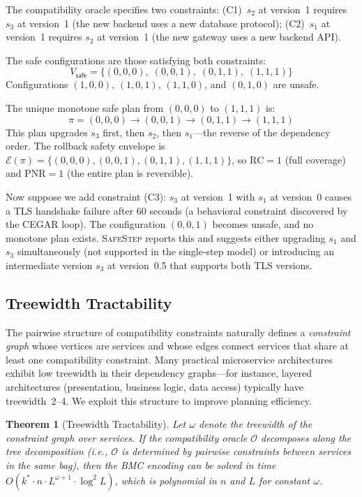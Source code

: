 \documentclass[10pt,twocolumn]{article}
\newtheorem{theorem}{Theorem}
\newcommand{\safestep}{\textsc{SafeStep}}
\newcommand{\ie}{\textit{i.e.}}
\begin{document}
The compatibility oracle specifies two constraints:
(C1)~$s_2$ at version~1 requires $s_3$ at version~1
(the new backend uses a new database protocol);
(C2)~$s_1$ at version~1 requires $s_2$ at version~1
(the new gateway uses a new backend API).

The safe configurations are those satisfying both constraints:
\[
V_{\mathsf{safe}} = \{(0,0,0),\; (0,0,1),\; (0,1,1),\; (1,1,1)\}
\]
Configurations $(1,0,0)$, $(1,0,1)$, $(1,1,0)$, and $(0,1,0)$
are unsafe.

The unique monotone safe plan from $(0,0,0)$ to $(1,1,1)$ is:
\[
\pi = (0,0,0) \to (0,0,1) \to (0,1,1) \to (1,1,1)
\]
This plan upgrades $s_3$ first, then $s_2$, then $s_1$---the
reverse of the dependency order. The rollback safety envelope
is $\mathcal{E}(\pi) = \{(0,0,0), (0,0,1), (0,1,1), (1,1,1)\}$,
so $\mathrm{RC} = 1$ (full coverage) and
$\mathrm{PNR} = 1$ (the entire plan is reversible).

Now suppose we add constraint (C3): $s_3$ at version~1 with
$s_1$ at version~0 causes a TLS handshake failure after 60
seconds (a behavioral constraint discovered by the CEGAR loop).
The configuration $(0,0,1)$ becomes unsafe, and no monotone plan
exists. \safestep{} reports this and suggests either upgrading
$s_1$ and $s_3$ simultaneously (not supported in the
single-step model) or introducing an intermediate version
$s_3$ at version~0.5 that supports both TLS versions.

\subsection{Treewidth Tractability}

The pairwise structure of compatibility constraints naturally
defines a \emph{constraint graph} whose vertices are services
and whose edges connect services that share at least one
compatibility constraint. Many practical microservice
architectures exhibit low treewidth in their dependency
graphs---for instance, layered architectures (presentation,
business logic, data access) typically have treewidth~2--4.
We exploit this structure to improve planning efficiency.

\begin{theorem}[Treewidth Tractability]
\label{thm:treewidth}
Let $\omega$ denote the treewidth of the constraint graph over
services. If the compatibility oracle $\mathcal{O}$ decomposes
along the tree decomposition (\ie, $\mathcal{O}$ is determined
by pairwise constraints between services in the same bag), then
the BMC encoding can be solved in time
$O(k^{*} \cdot n \cdot L^{\omega+1} \cdot \log^{2} L)$,
which is polynomial in $n$ and $L$ for constant $\omega$.
\end{theorem}
\end{document}

